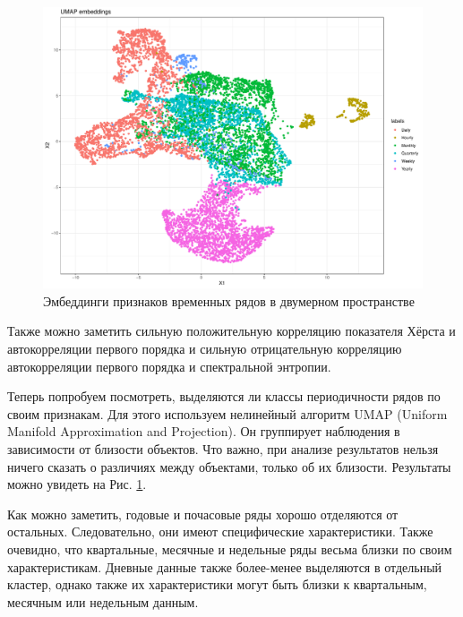 \documentclass[a4paper,12pt]{article}
\begin{document}
	\begin{figure}[h!]

				\begin{center}
		\includegraphics[width=\textwidth]{umap}
		\caption{Эмбеддинги признаков временных рядов в двумерном пространстве}
		\label{umap}
	\end{center}
\end{figure} 


	
	
	
	Также можно заметить сильную положительную корреляцию показателя Хёрста и автокорреляции первого порядка и сильную отрицательную корреляцию автокорреляции первого порядка и спектральной энтропии. 
	
	Теперь попробуем посмотреть, выделяются ли классы периодичности рядов по своим признакам. Для этого используем нелинейный алгоритм UMAP (Uniform Manifold Approximation and Projection). Он группирует наблюдения в зависимости от близости объектов. Что важно, при анализе результатов нельзя ничего сказать о различиях между объектами, только об их близости. Результаты можно увидеть на Рис. \ref{umap}.
		

	
	Как можно заметить, годовые  и почасовые ряды хорошо отделяются от остальных. Следовательно, они имеют специфические характеристики. Также очевидно, что квартальные, месячные и недельные ряды весьма близки по своим характеристикам. Дневные данные также более-менее выделяются в отдельный кластер, однако также их характеристики могут быть близки к квартальным, месячным или недельным данным.
	
\end{document}
